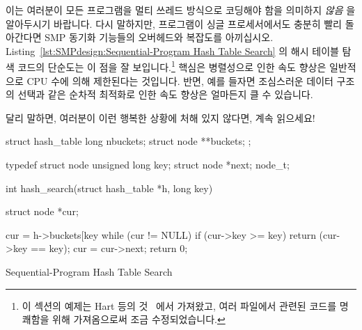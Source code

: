 이는 여러분이 모든 프로그램을 멀티 쓰레드 방식으로 코딩해야 함을 의미하지
\emph{않음} 을 알아두시기 바랍니다.
다시 말하지만, 프로그램이 싱글 프로세서에서도 충분히 빨리 돌아간다면 SMP 동기화
기능들의 오버헤드와 복잡도를 아끼십시오.
Listing~\ref{lst:SMPdesign:Sequential-Program Hash Table Search}
의 해시 테이블 탐색 코드의 단순도는 이 점을 잘 보입니다.\footnote{
	이 섹션의 예제는 Hart 등의 것~\cite{ThomasEHart2006a} 에서 가져왔고,
	여러 파일에서 관련된 코드를 명쾌함을 위해 가져옴으로써 조금
	수정되었습니다.}
핵심은 병렬성으로 인한 속도 향상은 일반적으로 CPU 수에 의해 제한된다는
것입니다.
반면, 예를 들자면 조심스러운 데이터 구조의 선택과 같은 순차적 최적화로 인한
속도 향상은 얼마든지 클 수 있습니다.

달리 말하면, 여러분이 이런 행복한 상황에 처해 있지 않다면, 계속 읽으세요!

\begin{listing}[tbhp]
\begin{VerbatimL}[commandchars=\\\[\]]
struct hash_table
{
	long nbuckets;
	struct node **buckets;
};

typedef struct node {
	unsigned long key;
	struct node *next;
} node_t;

int hash_search(struct hash_table *h, long key)
{
	struct node *cur;

	cur = h->buckets[key %
	while (cur != NULL) {
		if (cur->key >= key) {
			return (cur->key == key);
		}
		cur = cur->next;
	}
	return 0;
}
\end{VerbatimL}
\caption{Sequential-Program Hash Table Search}
\label{lst:SMPdesign:Sequential-Program Hash Table Search}
\end{listing}


